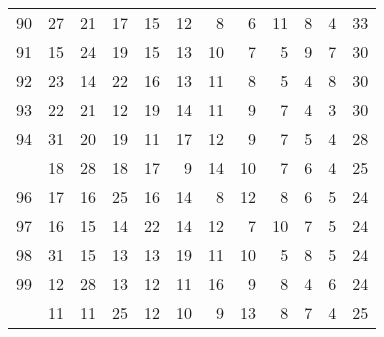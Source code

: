 \documentclass[
]{article}
\begin{document}
\begin{longtable}[t]{lrrrrrrrrrrr}
90 & 27 & 21 & 17 & 15 & 12 & 8 & 6 & 11 & 8 & 4 & 33\\
91 & 15 & 24 & 19 & 15 & 13 & 10 & 7 & 5 & 9 & 7 & 30\\
92 & 23 & 14 & 22 & 16 & 13 & 11 & 8 & 5 & 4 & 8 & 30\\
93 & 22 & 21 & 12 & 19 & 14 & 11 & 9 & 7 & 4 & 3 & 30\\
94 & 31 & 20 & 19 & 11 & 17 & 12 & 9 & 7 & 5 & 4 & 28\\
\addlinespace
95 & 18 & 28 & 18 & 17 & 9 & 14 & 10 & 7 & 6 & 4 & 25\\
96 & 17 & 16 & 25 & 16 & 14 & 8 & 12 & 8 & 6 & 5 & 24\\
97 & 16 & 15 & 14 & 22 & 14 & 12 & 7 & 10 & 7 & 5 & 24\\
98 & 31 & 15 & 13 & 13 & 19 & 11 & 10 & 5 & 8 & 5 & 24\\
99 & 12 & 28 & 13 & 12 & 11 & 16 & 9 & 8 & 4 & 6 & 24\\
\addlinespace
100 & 11 & 11 & 25 & 12 & 10 & 9 & 13 & 8 & 7 & 4 & 25\\*
\end{longtable}
\end{document}

